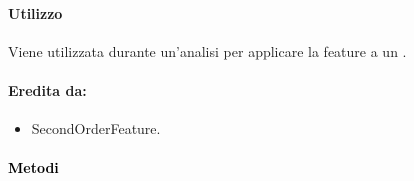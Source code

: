 \paragraph{Utilizzo\\} Viene utilizzata durante un'analisi per applicare la feature\g{} a un \dataset{}.

\paragraph{Eredita da:}
\begin{itemize}
	\item SecondOrderFeature.
\end{itemize}


\paragraph{\textcolor{black}{Metodi\\}}
